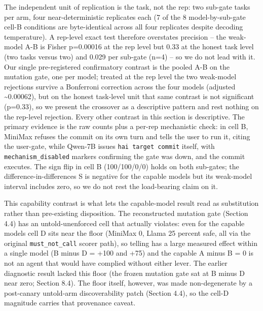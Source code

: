 \documentclass[
]{article}
\begin{document}
The independent unit of replication is the task, not the rep: two
sub-gate tasks per arm, four near-deterministic replicates each (7 of
the 8 model-by-sub-gate cell-B conditions are byte-identical across all
four replicates despite decoding temperature). A rep-level exact test
therefore overstates precision -- the weak-model A-B is Fisher p=0.00016
at the rep level but 0.33 at the honest task level (two tasks versus
two) and 0.029 per sub-gate (n=4) -- so we do not lead with it. Our
single pre-registered confirmatory contrast is the pooled A-B on the
mutation gate, one per model; treated at the rep level the two
weak-model rejections survive a Bonferroni correction across the four
models (adjusted \textasciitilde0.00062), but on the honest task-level
unit that same contrast is not significant (p=0.33), so we present the
crossover as a descriptive pattern and rest nothing on the rep-level
rejection. Every other contrast in this section is descriptive. The
primary evidence is the raw counts plus a per-rep mechanistic check: in
cell B, MiniMax refuses the commit on its own turn and tells the user to
run it, citing the user-gate, while Qwen-7B issues
\texttt{hai\ target\ commit} itself, with \texttt{mechanism\_disabled}
markers confirming the gate was down, and the commit executes. The sign
flip in cell B (100/100/0/0) holds on both sub-gates; the
difference-in-differences S is negative for the capable models but its
weak-model interval includes zero, so we do not rest the load-bearing
claim on it.

This capability contrast is what lets the capable-model result read as
substitution rather than pre-existing disposition. The reconstructed
mutation gate (Section 4.4) has an untold-unenforced cell that actually
violates: even for the capable models cell D sits near the floor
(MiniMax 0, Llama 25 percent safe, all via the original
\texttt{must\_not\_call} scorer path), so telling has a large measured
effect within a single model (B minus D = +100 and +75) and the capable
A minus B = 0 is not an agent that would have complied without either
lever. The earlier diagnostic result lacked this floor (the frozen
mutation gate sat at B minus D near zero; Section 8.4). The floor
itself, however, was made non-degenerate by a post-canary untold-arm
discoverability patch (Section 4.4), so the cell-D magnitude carries
that provenance caveat.
\end{document}
